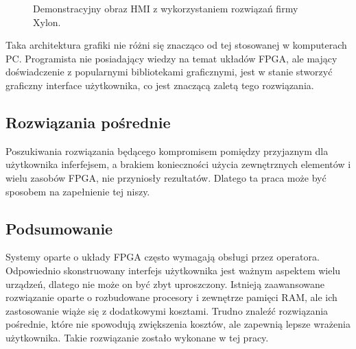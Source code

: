 \begin{figure}[htb]
	\centering
	\caption{ Demonstracyjny obraz HMI z wykorzystaniem rozwiązań firmy Xylon. \cite{logi3D} }
	\label{XylonDemo}
\end{figure}


Taka architektura grafiki nie różni się znacząco od tej stosowanej w komputerach PC. Programista nie posiadający wiedzy na temat układów FPGA, ale mający doświadczenie z popularnymi bibliotekami graficznymi, jest w stanie stworzyć graficzny interface użytkownika, co jest znaczącą zaletą tego rozwiązania.


\subsection{Rozwiązania pośrednie}


Poszukiwania rozwiązania będącego kompromisem pomiędzy przyjaznym dla użytkownika inferfejsem, a brakiem konieczności użycia zewnętrznych elementów i wielu zasobów FPGA, nie przyniosły rezultatów. Dlatego ta praca może być sposobem na zapełnienie tej niszy.


\subsection{Podsumowanie}


Systemy oparte o układy FPGA często wymagają obsługi przez operatora. Odpowiednio skonstruowany interfejs użytkownika jest ważnym aspektem wielu urządzeń, dlatego nie może on być zbyt uproszczony. Istnieją zaawansowane rozwiązanie oparte o rozbudowane procesory i zewnętrze pamięci RAM, ale ich zastosowanie wiąże się z dodatkowymi kosztami. Trudno znaleźć rozwiązania pośrednie, które nie spowodują zwiększenia kosztów, ale zapewnią lepsze wrażenia użytkownika. Takie rozwiązanie zostało wykonane w tej pracy.

